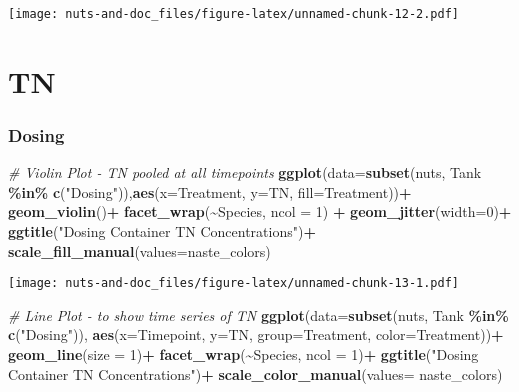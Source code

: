 \documentclass[
]{article}
\newenvironment{Shaded}{\begin{snugshade}}{\end{snugshade}}
\newcommand{\AttributeTok}[1]{\textcolor[rgb]{0.13,0.29,0.53}{#1}}
\newcommand{\CommentTok}[1]{\textcolor[rgb]{0.56,0.35,0.01}{\textit{#1}}}
\newcommand{\DecValTok}[1]{\textcolor[rgb]{0.00,0.00,0.81}{#1}}
\newcommand{\FunctionTok}[1]{\textcolor[rgb]{0.13,0.29,0.53}{\textbf{#1}}}
\newcommand{\NormalTok}[1]{#1}
\newcommand{\SpecialCharTok}[1]{\textcolor[rgb]{0.81,0.36,0.00}{\textbf{#1}}}
\newcommand{\StringTok}[1]{\textcolor[rgb]{0.31,0.60,0.02}{#1}}
\begin{document}
\texttt{[image: nuts-and-doc\_files/figure-latex/unnamed-chunk-12-2.pdf]}

\hypertarget{tn}{%
\section{TN}\label{tn}}

\hypertarget{dosing-4}{%
\subsubsection{Dosing}\label{dosing-4}}

\begin{Shaded}
\begin{Highlighting}[]
\CommentTok{\# Violin Plot {-} TN pooled at all timepoints}
\FunctionTok{ggplot}\NormalTok{(}\AttributeTok{data=}\FunctionTok{subset}\NormalTok{(nuts, Tank }\SpecialCharTok{\%in\%} \FunctionTok{c}\NormalTok{(}\StringTok{"Dosing"}\NormalTok{)),}\FunctionTok{aes}\NormalTok{(}\AttributeTok{x=}\NormalTok{Treatment, }\AttributeTok{y=}\NormalTok{TN, }\AttributeTok{fill=}\NormalTok{Treatment))}\SpecialCharTok{+}
  \FunctionTok{geom\_violin}\NormalTok{()}\SpecialCharTok{+}
  \FunctionTok{facet\_wrap}\NormalTok{(}\SpecialCharTok{\textasciitilde{}}\NormalTok{Species, }\AttributeTok{ncol =} \DecValTok{1}\NormalTok{) }\SpecialCharTok{+}
  \FunctionTok{geom\_jitter}\NormalTok{(}\AttributeTok{width=}\DecValTok{0}\NormalTok{)}\SpecialCharTok{+}
  \FunctionTok{ggtitle}\NormalTok{(}\StringTok{"Dosing Container TN Concentrations"}\NormalTok{)}\SpecialCharTok{+}
  \FunctionTok{scale\_fill\_manual}\NormalTok{(}\AttributeTok{values=}\NormalTok{naste\_colors)}
\end{Highlighting}
\end{Shaded}

\texttt{[image: nuts-and-doc\_files/figure-latex/unnamed-chunk-13-1.pdf]}

\begin{Shaded}
\begin{Highlighting}[]
\CommentTok{\# Line Plot {-} to show time series of TN}
\FunctionTok{ggplot}\NormalTok{(}\AttributeTok{data=}\FunctionTok{subset}\NormalTok{(nuts, Tank }\SpecialCharTok{\%in\%} \FunctionTok{c}\NormalTok{(}\StringTok{"Dosing"}\NormalTok{)), }\FunctionTok{aes}\NormalTok{(}\AttributeTok{x=}\NormalTok{Timepoint, }\AttributeTok{y=}\NormalTok{TN, }\AttributeTok{group=}\NormalTok{Treatment, }\AttributeTok{color=}\NormalTok{Treatment))}\SpecialCharTok{+}
  \FunctionTok{geom\_line}\NormalTok{(}\AttributeTok{size =} \DecValTok{1}\NormalTok{)}\SpecialCharTok{+}
  \FunctionTok{facet\_wrap}\NormalTok{(}\SpecialCharTok{\textasciitilde{}}\NormalTok{Species, }\AttributeTok{ncol =} \DecValTok{1}\NormalTok{)}\SpecialCharTok{+}
  \FunctionTok{ggtitle}\NormalTok{(}\StringTok{"Dosing Container TN Concentrations"}\NormalTok{)}\SpecialCharTok{+}
  \FunctionTok{scale\_color\_manual}\NormalTok{(}\AttributeTok{values=}\NormalTok{ naste\_colors)}
\end{Highlighting}
\end{Shaded}
\end{document}
